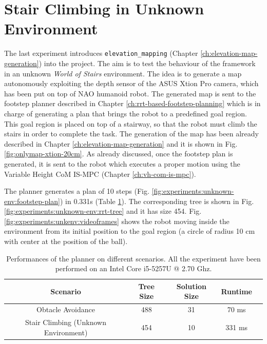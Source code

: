 \section{Stair Climbing in Unknown Environment}
The last experiment introduces \texttt{elevation\_mapping} (Chapter 
\ref{ch:elevation-map-generation}) into the project. The aim is to test the 
behaviour of the framework in an unknown \textit{World of Stairs} environment.
The idea is to generate a map autonomously exploiting the depth sensor of the 
ASUS Xtion Pro camera, which has been put on top of NAO humanoid robot.
The generated map is sent to the footstep planner described in Chapter 
\ref{ch:rrt-based-footstep-planning} which is in charge of generating a 
plan that brings the robot to a predefined goal region. This goal region is 
placed on top of a stairway, so that the robot must climb the stairs in order 
to complete the task. The generation of the map has been already described in 
Chapter \ref{ch:elevation-map-generation} and it is shown in Fig. 
\ref{fig:onlymap-xtion-20cm}. As already discussed, once the footstep plan 
is generated, it is sent to the robot which executes a proper motion 
using the Variable Height CoM IS-MPC (Chapter \ref{ch:vh-com-is-mpc}).

The planner generates a plan of 10 steps (Fig.
\ref{fig:experiments:unknown-env:footstep-plan}) in 0.331s (Table
\ref{table:rrt-stats}). The corresponding 
tree is shown in Fig. \ref{fig:experiments:unknown-env:rrt-tree} and it has 
size 454. Fig. \ref{fig:experiments:unkenv:videoframes} shows the robot moving
inside the environment from its initial position
to the goal region (a circle of radius 10 cm with center at the position
of the ball).

\begin{table}
	\centering
	\begin{tabular}{*{5}{c}}
    Scenario & Tree Size & Solution Size & Runtime\\
		\hline
    Obtacle Avoidance & 488 & 31 & 70 ms \\
    Stair Climbing (Unknown Environment) & 454 & 10 & 331 ms
	\end{tabular}
  \caption{Performances of the planner on different scenarios. All the 
      experiment have been performed on an Intel Core i5-5257U @ 2.70 Ghz.}
	\label{table:rrt-stats}
\end{table}

